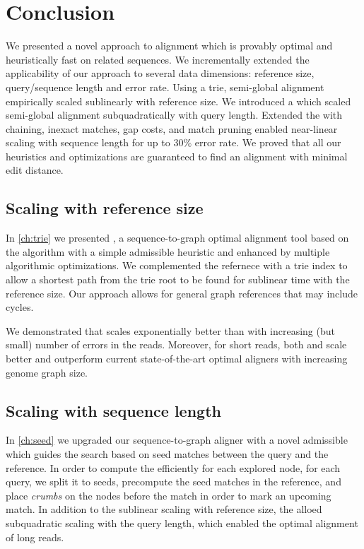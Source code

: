 \chapter*{Conclusion} \label{ch:conclusion}

We presented a novel \A approach to alignment which is provably optimal and
heuristically fast on related sequences. We incrementally extended the
applicability of our approach to several data dimensions: reference size,
query/sequence length and error rate. Using a trie, semi-global alignment
empirically scaled sublinearly with reference size. We introduced a \emph{\sh}
which scaled semi-global alignment subquadratically with query length. Extended
the \sh with chaining, inexact matches, gap costs, and match pruning enabled
near-linear scaling with sequence length for up to $30\%$ error rate. We proved
that all our heuristics and optimizations are guaranteed to find an alignment
with minimal edit distance.

\section{Scaling with reference size}

In \cref{ch:trie} we presented \astarix, a sequence-to-graph optimal alignment
tool based on the \A algorithm with a simple admissible heuristic and enhanced
by multiple algorithmic optimizations. We complemented the refernece with a trie
index to allow a shortest path from the trie root to be found for sublinear time
with the reference size. Our approach allows for general graph references that
may include cycles.

We demonstrated that \astarix scales exponentially better than \dijkstra with
increasing (but small) number of errors in the reads. Moreover, for short reads,
both \astarix and \dijkstra scale better and outperform current state-of-the-art
optimal aligners with increasing genome graph size.

\section{Scaling with sequence length}

In \cref{ch:seed} we upgraded our sequence-to-graph aligner \astarix with a
novel admissible \emph{\sh} which guides the search based on seed matches
between the query and the reference. In order to compute the \sh efficiently for
each explored node, for each query, we split it to seeds, precompute the seed
matches in the reference, and place \emph{crumbs} on the nodes before the match
in order to mark an upcoming match. In addition to the sublinear scaling with
reference size, the \sh alloed subquadratic scaling with the query length, which
enabled the optimal alignment of long reads. 

